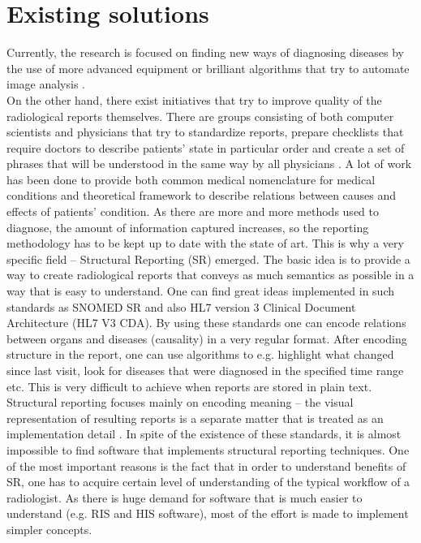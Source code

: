 \documentclass[12pt, twoside, openany]{report}
\theoremstyle{definition}
\begin{document}
\section{Existing solutions}
Currently, the research is focused on finding new ways of diagnosing diseases by  the use of more advanced equipment or brilliant algorithms that try to automate image analysis \cite{ai}. \\
On the other hand, there exist initiatives that try to improve quality of the radiological reports themselves. There are groups consisting of both computer scientists and physicians that try to standardize reports, prepare checklists that require doctors to describe patients' state in particular order and create a set of phrases that will be understood in the same way by all physicians \cite{snomed}. A lot of work has been done to provide both common medical nomenclature for medical conditions and theoretical framework to describe relations between causes and effects of patients' condition. As there are more and more methods used to diagnose, the amount of information captured increases, so the reporting methodology has to be kept up to date with the state of art. This is why a very specific field -- Structural Reporting (SR) emerged. The basic idea is to provide a way to create radiological reports that conveys as much semantics as possible in a way that is easy to understand. One can find great ideas implemented in such standards as SNOMED SR \cite{sr} and also HL7 version 3 Clinical Document Architecture (HL7 V3 CDA). By using these standards one can encode relations between organs and diseases (causality) in a very regular format. After encoding structure in the report, one can use algorithms to e.g. highlight what changed since last visit, look for diseases that were diagnosed in the specified time range etc. This is very difficult to achieve when reports are stored in plain text. Structural reporting focuses mainly on encoding meaning -- the visual representation of resulting reports is a separate matter that is treated as an implementation detail \cite{sr}.
In spite of the existence of these standards, it is almost impossible to find software that implements structural reporting techniques. One of the most important reasons is the fact that in order to understand benefits of SR, one has to acquire certain level of understanding of the typical workflow of a radiologist. As there is huge demand for software that is much easier to understand (e.g. RIS and HIS software), most of the effort is made to implement simpler concepts.
\\ \\
\end{document}
